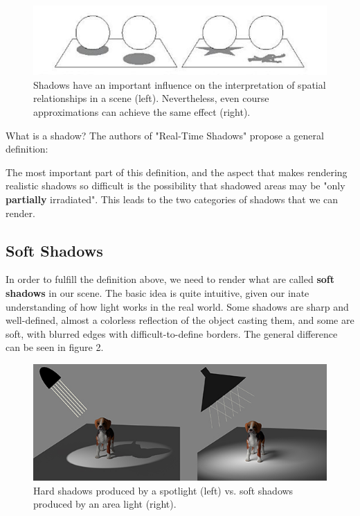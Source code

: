 \documentclass[acmsmall, screen, authorversion, nonacm]{acmart}
\begin{document}
\begin{figure}[h]
  \centering
  \includegraphics[width=\linewidth]{images/spatial}
  \caption{Shadows have an important influence on the interpretation of spatial relationships in a scene (left). Nevertheless, even course approximations can achieve the same effect (right). \cite{eisemann2011real}}
\end{figure}

What is a shadow? The authors of "Real-Time Shadows" propose a general definition:\newline

 \cite{eisemann2011real}\newline

The most important part of this definition, and the aspect that makes rendering realistic shadows so difficult is the possibility that shadowed areas may be "only \textbf{partially} irradiated". This leads to the two categories of shadows that we can render.

\subsection{Soft Shadows}

In order to fulfill the definition above, we need to render what are called \textbf{soft shadows} in our scene. The basic idea is quite intuitive, given our inate understanding of how light works in the real world. Some shadows are sharp and well-defined, almost a colorless reflection of the object casting them, and some are soft, with blurred edges with difficult-to-define borders. The general difference can be seen in figure 2.

\begin{figure}[h]
  \centering
  \includegraphics[width=\linewidth]{images/dog}
  \caption{Hard shadows produced by a spotlight (left) vs. soft shadows produced by an area light (right).}
\end{figure}
\end{document}
